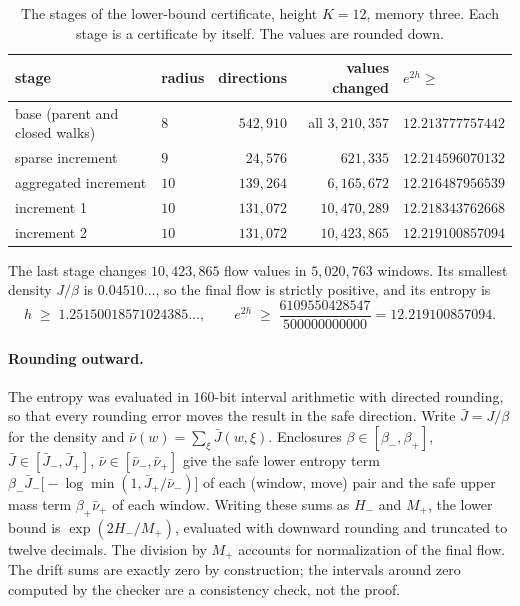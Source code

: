 \begin{table}[htb]
\centering
\begin{tabular}{llrrl}
\toprule
stage & radius & directions & values changed & $e^{2h}\ge$ \\
\midrule
base (parent and closed walks) & $8$ & $542{,}910$ & all $3{,}210{,}357$ & $12.213777757442$\\
sparse increment & $9$ & $24{,}576$ & $621{,}335$ & $12.214596070132$\\
aggregated increment & $10$ & $139{,}264$ & $6{,}165{,}672$ & $12.216487956539$\\
increment 1 & $10$ & $131{,}072$ & $10{,}470{,}289$ & $12.218343762668$\\
increment 2 & $10$ & $131{,}072$ & $10{,}423{,}865$ & $\mathbf{12.219100857094}$\\
\bottomrule
\end{tabular}
\caption{The stages of the lower-bound certificate, height $K=12$, memory three. Each stage is a certificate by
itself. The values are rounded down.}
\label{tab:lower}
\end{table}

The last stage changes $10{,}423{,}865$ flow values in $5{,}020{,}763$ windows. Its smallest density $J/\beta$ is
$0.04510\ldots$, so the final flow is strictly positive, and its entropy is
\[ h\;\ge\;1.25150018571024385\ldots,\qquad e^{2h}\;\ge\;\frac{6109550428547}{500000000000}=12.219100857094 . \]

\paragraph{Rounding outward.}
The entropy was evaluated in $160$-bit interval arithmetic with directed rounding, so that every rounding error
moves the result in the safe direction. Write $\bar J=J/\beta$ for the density and $\bar\nu(w)=\sum_\xi\bar J(w,\xi)$.
Enclosures $\beta\in[\beta_-,\beta_+]$, $\bar J\in[\bar J_-,\bar J_+]$, $\bar\nu\in[\bar\nu_-,\bar\nu_+]$ give the safe
lower entropy term $\beta_-\bar J_-\bigl[-\log\min(1,\bar J_+/\bar\nu_-)\bigr]$ of each (window, move) pair and the safe
upper mass term $\beta_+\bar\nu_+$ of each window. Writing these sums as $H_-$ and $M_+$, the lower bound is $\exp(2H_-/M_+)$, evaluated with downward rounding
and truncated to twelve decimals. The division by $M_+$ accounts for normalization of the final flow. The drift sums are exactly zero by
construction; the intervals around zero computed by the checker are a consistency check, not the proof.
